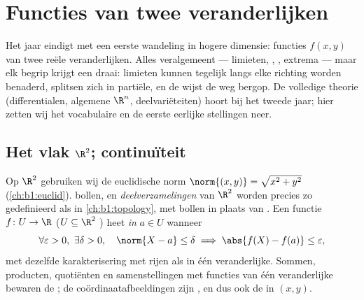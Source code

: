 \chapter{Functies van twee veranderlijken}\label{ch:b1:multivar}

Het jaar eindigt met een eerste wandeling in hogere dimensie:
functies $f(x, y)$ van twee reële veranderlijken. Alles
veralgemeent --- limieten, , , extrema ---
maar elk begrip krijgt een draai: limieten kunnen tegelijk langs
elke richting worden benaderd,  splitsen zich in
partiële, en de  wijst de weg bergop. De volledige theorie
(differentialen, algemene $\R^n$, deelvariëteiten) hoort bij het
tweede jaar; hier zetten wij het vocabulaire en de eerste eerlijke
stellingen neer.

\section{Het vlak $\R^2$; continuïteit}

\begin{definition}\label{def:b1:multivar:topology}
Op $\R^2$ gebruiken wij de euclidische norm $\norm{(x,y)} =
\sqrt{x^2 + y^2}$ (\cref{ch:b1:euclid}).  bollen,  en
\emph{ deelverzamelingen} van $\R^2$ worden precies zo
gedefinieerd als in \cref{ch:b1:topology}, met bollen in plaats van
. Een functie $f \colon U \to \R$ ($U \subseteq \R^2$
) heet \emph{ in} $a \in U$ wanneer
\[
\forall\varepsilon > 0,\ \exists\delta > 0, \quad
\norm{X - a} \leq \delta \implies \abs{f(X) - f(a)} \leq
\varepsilon,
\]
met dezelfde karakterisering met rijen als in één veranderlijke.
Sommen, producten, quotiënten en samenstellingen met 
functies van één veranderlijke bewaren de ; de
coördinaatafbeeldingen zijn , en dus ook de  in
$(x,y)$.
\end{definition}

